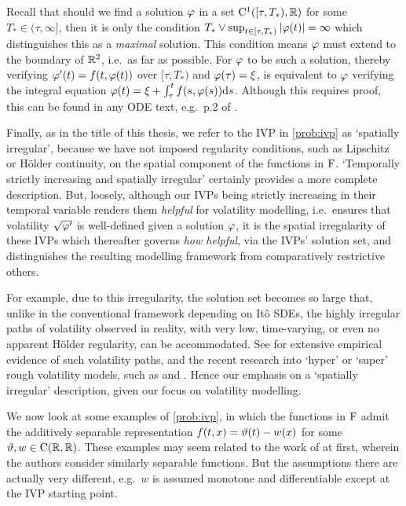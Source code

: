 Recall that should we find a solution $\varphi$ in a set $\mathrm{C}^1([\tau,T_*),\mathbb{R})$ for some $T_*\in(\tau,\infty]$, then it is only the condition $T_*\vee\sup_{t\in[\tau,T_*)}|\varphi(t)|=\infty$ which distinguishes this as a \emph{maximal} solution. This condition means $\varphi$ must extend to the boundary of $\mathbb{R}^2$, i.e.~as far as possible. For $\varphi$ to be such a solution, thereby verifying $\varphi'(t)=f(t,\varphi(t))$ over $[\tau,T_*)$ and $\varphi(\tau)=\xi$, is equivalent to $\varphi$ verifying the integral equation $\varphi(t)=\xi+\int_\tau^t f(s,\varphi(s))\mathrm{d} s$. Although this requires proof, this can be found in any ODE text, e.g.~p.2 of \cite{coddington_1955}.

Finally, as in the title of this thesis, we refer to the IVP in \autoref{prob:ivp} as `spatially irregular', because we have not imposed regularity conditions, such as Lipschitz or H\"older continuity, on the spatial component of the functions in $\mathrm{F}$. `Temporally strictly increasing and spatially irregular' certainly provides a more complete description. But, loosely, although our IVPs being strictly increasing in their temporal variable renders them \emph{helpful} for volatility modelling, i.e.~ensures that volatility $\sqrt{\varphi'}$ is well-defined given a solution $\varphi$, it is the spatial irregularity of these IVPs which thereafter governs \emph{how helpful}, via the IVPs' solution set, and distinguishes the resulting modelling framework from comparatively restrictive others.

For example, due to this irregularity, the solution set becomes so large that, unlike in the conventional framework depending on It\^o SDEs, the highly irregular paths of volatility observed in reality, with very low, time-varying, or even no apparent  H\"older regularity, can be accommodated. See \cite{bennedsen_2022} for extensive empirical evidence of such volatility paths, and the recent research into `hyper' or `super' rough volatility models, such as \cite{jusselin_2020} and \cite{bayer_2021}. Hence our emphasis on a `spatially irregular' description, given our focus on volatility modelling.

We now look at some examples of \autoref{prob:ivp}, in which the functions in $\mathrm{F}$ admit the additively separable representation $f(t,x)=\vartheta(t)-w(x)$ for some $\vartheta,w\in\mathrm{C}(\mathbb{R},\mathbb{R})$. These examples may seem related to the work of \cite{kaper_1988} at first, wherein the authors consider similarly separable functions. But the assumptions there are actually very different, e.g.~$w$ is assumed monotone and differentiable except at the IVP starting point.

